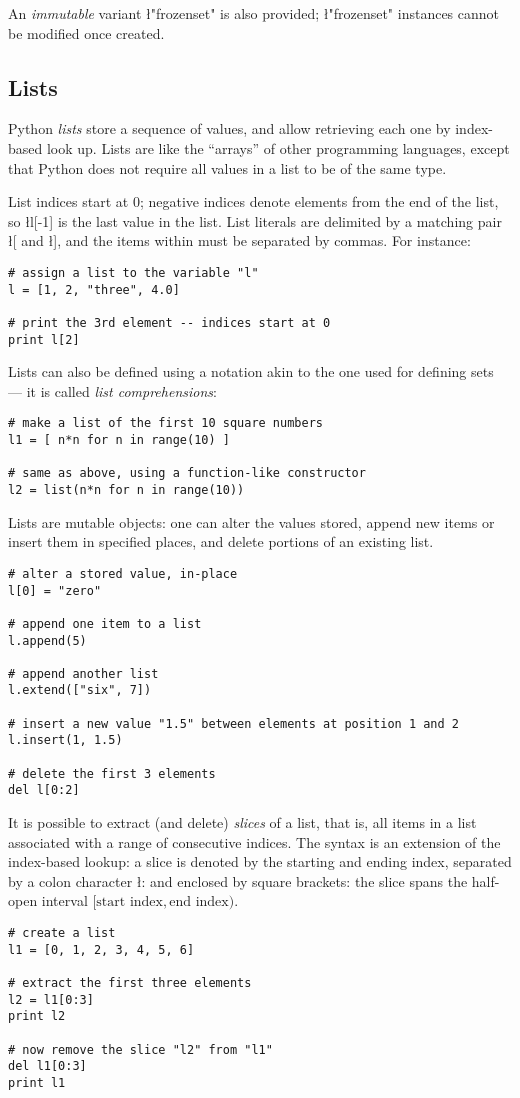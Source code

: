 An \emph{immutable} variant \l"frozenset" is also provided;
\l"frozenset" instances cannot be modified once created.

                                                               
\subsection{Lists}
\label{sec:lists}

Python \emph{lists} store a sequence of values, and allow retrieving
each one by index-based look up.  Lists are like the ``arrays'' of
other programming languages, except that Python does not require all
values in a list to be of the same type.

List indices start at 0; negative indices denote elements from the end
of the list, so \l{l[-1]} is the last value in the list.  List
literals are delimited by a matching pair \l{[} and \l{]}, and the
items within must be separated by commas. For instance:
\begin{lstlisting}
# assign a list to the variable "l"
l = [1, 2, "three", 4.0]

# print the 3rd element -- indices start at 0
print l[2]
\end{lstlisting}
Lists can also be defined using a notation akin to the one used for
defining sets --- it is called \emph{list comprehensions}:
\begin{lstlisting}
# make a list of the first 10 square numbers
l1 = [ n*n for n in range(10) ]

# same as above, using a function-like constructor
l2 = list(n*n for n in range(10))
\end{lstlisting}

Lists are mutable objects: one can alter the values stored, append new
items or insert them in specified places, and delete portions of an
existing list.
\begin{lstlisting}
# alter a stored value, in-place
l[0] = "zero"

# append one item to a list
l.append(5)

# append another list
l.extend(["six", 7])

# insert a new value "1.5" between elements at position 1 and 2
l.insert(1, 1.5)

# delete the first 3 elements
del l[0:2]
\end{lstlisting}
It is possible to extract (and delete) \emph{slices} of a list, that is,
all items in a list associated with a range of consecutive indices.
The syntax is an extension of the index-based lookup: a slice is
denoted by the starting and ending index, separated by a colon
character \l{:} and enclosed by square brackets: the slice spans the
half-open interval $[\text{start index}, \text{end index})$.
\begin{lstlisting}
# create a list
l1 = [0, 1, 2, 3, 4, 5, 6]

# extract the first three elements
l2 = l1[0:3]
print l2

# now remove the slice "l2" from "l1"
del l1[0:3]
print l1
\end{lstlisting}


